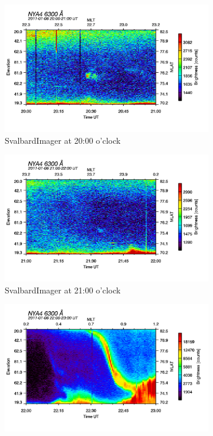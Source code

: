 \documentclass[10pt,a4paper]{article}
\begin{document}
\begin{figure}[h]
\begin{subfigure}{0.3\textwidth}
	\includegraphics[width=\textwidth]{SvalbardImager6300A20.png}
	\caption{ SvalbardImager at 20:00 o'clock \label{SBI_6_20}}
\end{subfigure}
\begin{subfigure}{0.3\textwidth}
\centering
	\includegraphics[width=\textwidth]{SvalbardImager6300A21.png}
	\caption{ SvalbardImager at 21:00 o'clock \label{SBI_6_21}}
\end{subfigure}
\begin{subfigure}{0.3\textwidth}
\centering
	\includegraphics[width=\textwidth]{SvalbardImager6300A22.png}

\end{subfigure}
\end{figure}
\end{document}
